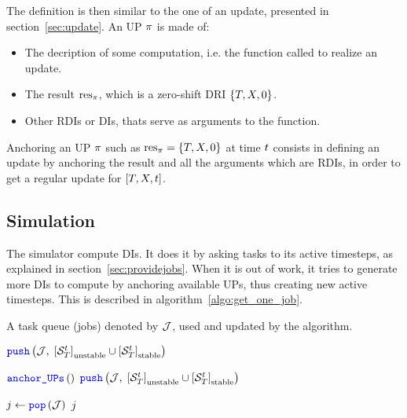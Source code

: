 The definition is then similar to the one of an update, presented in section~\ref{sec:update}.
An UP $\pi$ is made of:
\begin{itemize}
\item The decription of some computation, i.e. the function called to realize an update.
\item The result $\mathrm{res}_{\pi}$, which is a zero-shift DRI ${\left\{T,X,0\right\}}$.
\item Other RDIs or DIs, thats serve as arguments to the function.
\end{itemize}

Anchoring an UP $\pi$ such as $\mathrm{res}_{\pi} = {\left\{T,X,0\right\}}$ at time $t$ consists in defining an update by anchoring the result and all the arguments which are RDIs, in order to get a regular update for ${{\left[T,X,t\right]}}$.

\subsection{Simulation}

The simulator compute DIs. It does it by asking tasks to its active timesteps, as explained in section~\ref{sec:providejobs}. When it is out of work, it tries to generate more DIs to compute by anchoring available UPs, thus creating new active timesteps. This is described in algorithm~\ref{algo:get_one_job}.
\begin{algorithm}
  \caption{$\CallCode{get\_one\_job}{}$ \label{algo:get_one_job}}
  \begin{algorithmic}[1]
    \REQUIRE A task queue (jobs) denoted by ${\cal J}$, used and updated by the algorithm.
    \IF{$\Jobs = \emptyset$}
    \STATE {}
    
    \IF{$\Status\DftTS \in \Set{\Relaxing, \Checking}$}
    \STATE $\CallCode{push}{\Jobs, \; \DftTSQu \Union \DftTSQs}$ 
    \ENDIF
    \ENDFOR
    
    \IF{$\Jobs = \emptyset$}
    \STATE {}
    \STATE {}
    \STATE $\CallCode{anchor\_UPs}{}$ 
    \STATE {}
    \IF{$\Status\DftTS \in \Set{\Relaxing, \Checking}$}
    \STATE $\CallCode{push}{\Jobs, \; \DftTSQu \Union \DftTSQs}$ 
    \ENDIF
    \ENDFOR
    \ENDIF

    
    \ENDIF
    \IF{$\Jobs = \emptyset$}
    \RETURN {}
    \ELSE
    \STATE $\Job \Affect \CallCode{pop}{\Jobs}$
    \RETURN $j$ 
    \ENDIF
  \end{algorithmic}
\end{algorithm}

